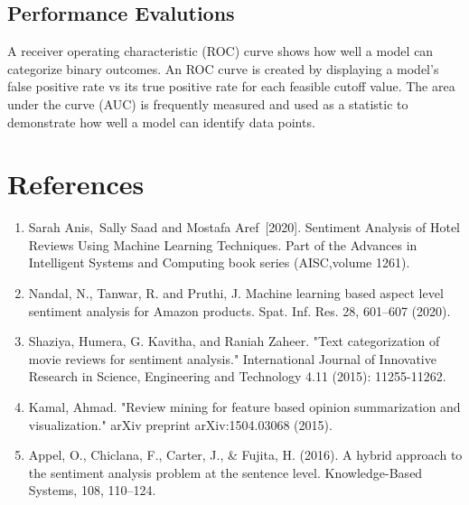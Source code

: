 \subsection{Performance Evalutions }

A receiver operating characteristic (ROC) curve shows how well a model can categorize binary outcomes. An ROC curve is created by displaying a model's false positive rate vs its true positive rate for each feasible cutoff value. The area under the curve (AUC) is frequently measured and used as a statistic to demonstrate how well a model can identify data points. 





\section{References}
\begin{enumerate}



\item Sarah Anis, Sally Saad and Mostafa Aref [2020].
Sentiment Analysis of Hotel Reviews Using Machine Learning Techniques. Part of the Advances in Intelligent Systems and Computing book series (AISC,volume 1261).
\item Nandal, N., Tanwar, R. and Pruthi, J. Machine learning based aspect level sentiment analysis for Amazon products. Spat. Inf. Res. 28, 601–607 (2020).
\item Shaziya, Humera, G. Kavitha, and Raniah Zaheer. "Text categorization of movie reviews for sentiment analysis." International Journal of Innovative Research in Science, Engineering and Technology 4.11 (2015): 11255-11262.


\item Kamal, Ahmad. "Review mining for feature based opinion summarization and visualization." arXiv preprint arXiv:1504.03068 (2015).


\item Appel, O., Chiclana, F., Carter, J., & Fujita, H. (2016). A hybrid approach to the sentiment analysis problem at the sentence level. Knowledge-Based Systems, 108, 110–124.

\end{enumerate}


